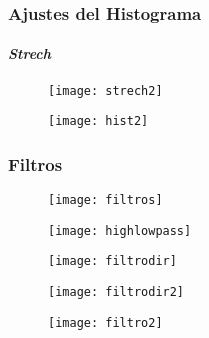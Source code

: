 \documentclass[14pt]{beamer}
\begin{document}
\begin{frame}
\frametitle{Ajustes del Histograma}
\framesubtitle{\emph{Strech}}
  \begin{figure}
    \centering
    \texttt{[image: strech2]}
  \end{figure}
\tiny{}
\end{frame}
\begin{frame}
  \begin{figure}
    \centering
    \texttt{[image: hist2]}
  \end{figure}
\tiny{}
\end{frame}
\begin{frame}
\frametitle{Filtros}
  \begin{figure}
    \centering
    \texttt{[image: filtros]}
  \end{figure}
\tiny{}
\end{frame}
\begin{frame}
  \begin{figure}
    \centering
    \texttt{[image: highlowpass]}
  \end{figure}
\tiny{}
\end{frame}
\begin{frame}
  \begin{figure}
    \centering
    \texttt{[image: filtrodir]}
  \end{figure}
\tiny{}
\end{frame}
\begin{frame}
  \begin{figure}
    \centering
    \texttt{[image: filtrodir2]}
  \end{figure}
\tiny{}
\end{frame}
\begin{frame}
  \begin{figure}
    \centering
    \texttt{[image: filtro2]}
  \end{figure}
\tiny{}
\end{frame}
\end{document}
